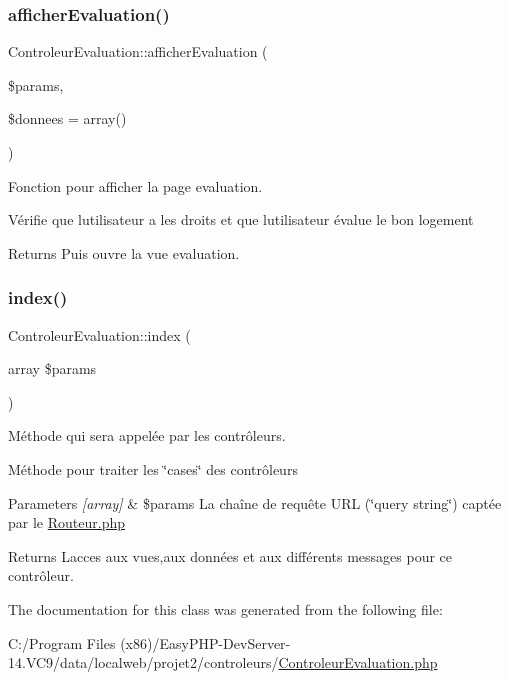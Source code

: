 \subsubsection{\texorpdfstring{afficher\+Evaluation()}{afficherEvaluation()}}
{\footnotesize\ttfamily Controleur\+Evaluation\+::afficher\+Evaluation (\begin{DoxyParamCaption}\item[{}]{\$params,  }\item[{}]{\$donnees = {\ttfamily array()} }\end{DoxyParamCaption})}



Fonction pour afficher la page evaluation. 

Vérifie que l\textquotesingle{}utilisateur a les droits et que l\textquotesingle{}utilisateur évalue le bon logement \begin{DoxyReturn}{Returns}
Puis ouvre la vue evaluation. 
\end{DoxyReturn}
\mbox{\label{class_controleur_evaluation_ae501bf1013f7f16c03f8a57b47ae82ed}} 
\subsubsection{\texorpdfstring{index()}{index()}}
{\footnotesize\ttfamily Controleur\+Evaluation\+::index (\begin{DoxyParamCaption}\item[{array}]{\$params }\end{DoxyParamCaption})}



Méthode qui sera appelée par les contrôleurs. 

Méthode pour traiter les \char`\"{}cases\char`\"{} des contrôleurs 
\begin{DoxyParams}{Parameters}
{\em \mbox{[}array\mbox{]}} & \$params La chaîne de requête U\+RL (\char`\"{}query string\char`\"{}) captée par le \hyperlink{_routeur_8php}{Routeur.\+php} \\
\hline
\end{DoxyParams}
\begin{DoxyReturn}{Returns}
L\textquotesingle{}acces aux vues,aux données et aux différents messages pour ce contrôleur. 
\end{DoxyReturn}


The documentation for this class was generated from the following file\+:\begin{DoxyCompactItemize}
\item 
C\+:/\+Program Files (x86)/\+Easy\+P\+H\+P-\/\+Dev\+Server-\/14.\+V\+C9/data/localweb/projet2/controleurs/\hyperlink{_controleur_evaluation_8php}{Controleur\+Evaluation.\+php}\end{DoxyCompactItemize}

